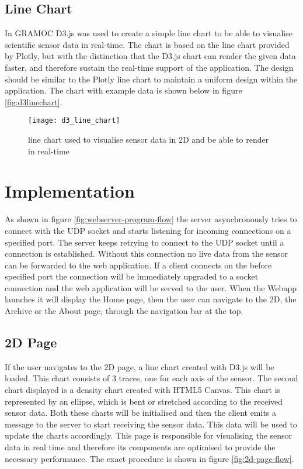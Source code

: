 \subsection{Line Chart}
\label{subsec:d3linechart}
In GRAMOC D3.js was used to create a simple line chart to be able to visualise scientific sensor data in real-time. The chart is based on the line chart provided by Plotly, but with the distinction that the D3.js chart can render the given data faster, and therefore sustain the real-time support of the application. The design should be similar to the Plotly line chart to maintain a uniform design within the application. The chart with example data is shown below in figure \vref{fig:d3linechart}.

\begin{figure}[H]
    \centering
    \texttt{[image: d3\_line\_chart]}
    \caption{line chart used to visualise sensor data in 2D and be able to render in real-time}
    \label{fig:d3linechart}
\end{figure}

\section{Implementation}
As shown in figure \vref{fig:webserver-program-flow} the server asynchronously tries to connect with the UDP socket and starts listening for incoming connections on a specified port. The server keeps retrying to connect to the UDP socket until a connection is established. Without this connection no live data from the sensor can be forwarded to the web application. If a client connects on the before specified port the connection will be immediately upgraded to a socket connection and the web application will be served to the user. When the Webapp launches it will display the Home page, then the user can navigate to the 2D, the Archive or the About page, through the navigation bar at the top.

\subsection{2D Page}
If the user navigates to the 2D page, a line chart created with D3.js will be loaded. This chart consists of 3 traces, one for each axis of the sensor. The second chart displayed is a density chart created with HTML5 Canvas. This chart is represented by an ellipse, which is bent or stretched according to the received sensor data. Both these charts will be initialised and then the client emits a message to the server to start receiving the sensor data. This data will be used to update the charts accordingly. This page is responsible for visualising the sensor data in real time and therefore its components are optimised to provide the necessary performance. The exact procedure is shown in figure \vref{fig:2d-page-flow}.

